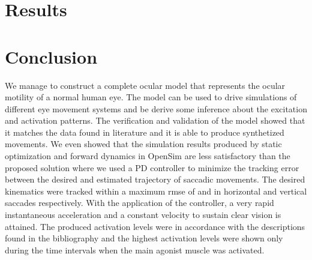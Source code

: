 \documentclass[11pt,a4paper,draft=false]{report}
\begin{document}
\section*{Results}\label{sec:results}


\section*{Conclusion}\label{sec:conclusion}

We manage to construct a complete ocular model that represents the ocular
motility of a normal human eye. The model can be used to drive simulations of
different eye movement systems and be derive some inference about the excitation
and activation patterns. The verification and validation of the model showed
that it matches the data found in literature and it is able to produce
synthetized movements. We even showed that the simulation results produced by
static optimization and forward dynamics in OpenSim are less satisfactory than
the proposed solution where we used a PD controller to minimize the tracking
error between the desired and estimated trajectory of saccadic movements. The
desired kinematics were tracked within a maximum \gls{rmse} of and in horizontal
and vertical saccades respectively. With the application of the controller, a
very rapid instantaneous acceleration and a constant velocity to sustain clear
vision is attained. The produced activation levels were in accordance with the
descriptions found in the bibliography and the highest activation levels were
shown only during the time intervals when the main agonist muscle was activated.

% 


\end{document}
